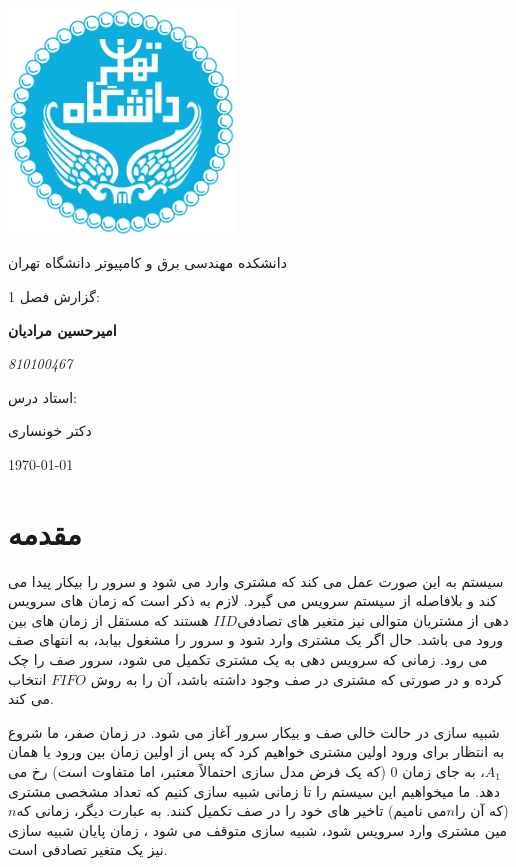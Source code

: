 \documentclass[12pt,a4paper]{report}
\begin{document}
	\begin{titlepage}
		\centering
		\includegraphics[width=0.45\textwidth]{Figures/logo}\par\vspace{1cm}
		{\scshape\LARGE  دانشکده مهندسی برق و کامپیوتر دانشگاه تهران \par}
		\vspace{1cm}
		{\scshape\Large  گزارش فصل 1: \par}
		\vspace{1.5cm}
		{\huge\bfseries امیرحسین مرادیان\par}
		\vspace{0.5cm}
		{\Large\itshape 810100467\par}
		\vfill
		\huge {استاد درس:}
		\par
		دکتر خونساری
		
		\vfill
		
		{\large \today\par}
	\end{titlepage}
	
	\pagebreak
	
	\section*{مقدمه}
	
	سیستم به این صورت عمل می کند که مشتری وارد می شود و سرور را بیکار پیدا می کند و بلافاصله از سیستم سرویس می گیرد. لازم به ذکر است که زمان های سرویس دهی از مشتریان متوالی نیز متغیر های تصادفی$ IID$ هستند که مستقل از زمان های بین ورود می باشد. حال اگر یک مشتری وارد شود و سرور را مشغول بیابد، به انتهای صف می رود. زمانی که سرویس دهی به یک مشتری تکمیل می شود، سرور صف را چک کرده و در صورتی که مشتری در صف وجود داشته باشد، آن را به روش $ FIFO $ انتخاب می کند.

	شبیه سازی در حالت خالی صف و بیکار سرور آغاز می شود. در زمان صفر، ما شروع به انتظار برای ورود اولین مشتری خواهیم کرد که پس از اولین زمان بین ورود یا همان $A_1$، به جای زمان 0 (که یک فرض مدل سازی احتمالاً معتبر، اما متفاوت است) رخ می دهد. ما میخواهیم این سیستم را تا زمانی شبیه سازی کنیم که تعداد مشخصی مشتری (که آن را$ n $می نامیم) تاخیر های خود را در صف تکمیل کنند. به عبارت دیگر، زمانی که$ n$ مین مشتری وارد سرویس شود، شبیه سازی متوقف می شود ، زمان پایان شبیه سازی نیز یک متغیر تصادفی است.
	
\end{document}
